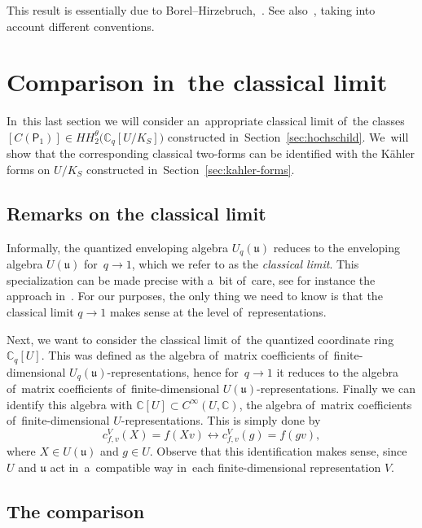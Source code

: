 \documentclass[10pt,a4paper]{amsart}
\numberwithin{equation}{section}
\newcommand{\lieu}{\mathfrak{u}}
\newcommand{\CU}{\mathbb{C}[U]}
\newcommand{\Uqu}{U_q(\mathfrak{u})}
\newcommand{\CqU}{\mathbb{C}_q[U]}
\newcommand{\Cqflag}{\mathbb{C}_q[U / K_S]}
\newcommand{\bbC}{\mathbb{C}}
\newcommand{\proj}{\mathsf{P}}
\begin{document}
\begin{Remark}
This result is essentially due to Borel--Hirzebruch,~\cite[Proposition~14.6]{bo-hi}.
See also~\cite[Theorem~7.5]{snow}, taking into account different conventions.
\end{Remark}

\section{Comparison in~the classical limit}
\label{sec:comparison}

In~this last section we will consider an~appropriate classical limit of~the classes $[C(\proj_1)] \in HH^\theta_2\big(\Cqflag\big)$ constructed in~Section~\ref{sec:hochschild}.
We~will show that the corresponding classical two-forms can be identified with the K\"ahler forms on $U / K_S$ constructed in~Section~\ref{sec:kahler-forms}.

\subsection{Remarks on the classical limit}

Informally, the quantized enveloping algebra $\Uqu$ reduces to the enveloping algebra $U(\lieu)$ for~$q \to 1$, which we refer to as the \emph{classical limit}.
This specialization can be made precise with a~bit of~care, see for instance the approach in~\cite[Section~3.4]{hong-kang}.
For our purposes, the only thing we need to know is that the classical limit $q \to 1$ makes sense at the level of~representations.

Next, we want to consider the classical limit of~the quantized coordinate ring $\CqU$.
This was defined as the algebra of~matrix coefficients of~finite-dimensional $\Uqu$-repre\-sentations, hence for~$q \to 1$ it reduces to the algebra of~matrix coefficients of~finite-dimensional \mbox{$U(\lieu)$-repre}\-sentations.
Finally we can identify this algebra with $\CU \subset C^\infty(U, \bbC)$, the algebra of~mat\-rix coefficients of~finite-dimensional $U$-representations.
This is simply done by
\[
c^V_{f, v}(X) = f(X v) \longleftrightarrow c^V_{f, v}(g) = f(g v),
\]
where $X \in U(\lieu)$ and $g \in U$.
Observe that this identification makes sense, since $U$ and $\lieu$ act in~a~compatible way in~each finite-dimensional representation $V$.

\subsection{The comparison}
\end{document}
